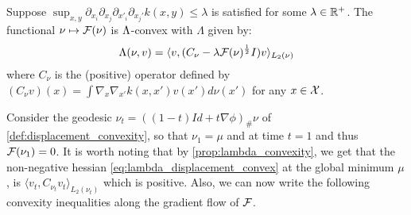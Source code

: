 \begin{proposition}
	\label{prop:lambda_convexity} Suppose $\sup_{x,y} \partial_{x_{i}}\partial_{x_{j}}\partial_{x'_{i}}\partial_{x_{j}'}k(x,y)\le \lambda$ is satisfied for some $\lambda \in {{\mathbb R}}^+$. The functional $\nu\mapsto {{\mathcal F}}(\nu)$ is $\text{\ensuremath{\Lambda}}$-convex
	with $\Lambda$ given by:
	\begin{equation}
	\Lambda(\nu,v)=\langle v,(C_{\nu}-\lambda {{\mathcal F}}(\nu)^{\frac{1}{2}}I)v\rangle_{L_{2}(\nu)}\label{eq:Lambda}
	\end{equation}
	where $C_{\nu}$ is the (positive) operator defined by $(C_{\nu}v)(x)=\int\nabla_{x}\nabla_{x'}k(x,x')v(x')d\nu(x')$ for any $x \in {{\mathcal X}}$.
\end{proposition}
%
%
Consider the geodesic $\nu_{t}=((1-t)Id+t\nabla\phi)_{\#}\nu$ of \cref{def:displacement_convexity}, so that $\nu_{1}=\mu$ and at time $t=1$ and thus ${{\mathcal F}}(\nu_{1})=0$. It is worth noting that by \cref{prop:lambda_convexity}, we get that the non-negative hessian \eqref{eq:lambda_displacement_convex} at the global minimum $\mu$, is $\langle v_{t},C_{\nu_{t}}v_{t}\rangle_{L_{2}(\nu_{t})}$ which is positive. Also, we can now write the following convexity inequalities along the gradient flow of ${{\mathcal F}}$.


